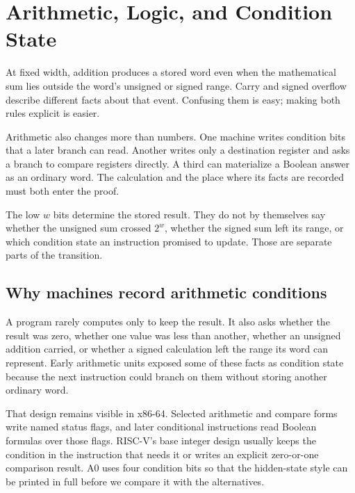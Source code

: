 \chapter{Arithmetic, Logic, and Condition State}
\label{ch:arithmetic-condition}

At fixed width, addition produces a stored word even when the mathematical
sum lies outside the word's unsigned or signed range. Carry and signed
overflow describe different facts about that event. Confusing them is easy;
making both rules explicit is easier.

Arithmetic also changes more than numbers. One machine writes condition bits
that a later branch can read. Another writes only a destination register and
asks a branch to compare registers directly. A third can materialize a Boolean
answer as an ordinary word. The calculation and the place where its facts are
recorded must both enter the proof.

\begin{keyidea}[title={A result word does not contain every arithmetic fact}]
The low \(w\) bits determine the stored result. They do not by themselves say
whether the unsigned sum crossed \(2^w\), whether the signed sum left its
range, or which condition state an instruction promised to update. Those are
separate parts of the transition.
\end{keyidea}

\section{Why machines record arithmetic conditions}

A program rarely computes only to keep the result. It also asks whether the
result was zero, whether one value was less than another, whether an unsigned
addition carried, or whether a signed calculation left the range its word can
represent. Early arithmetic units exposed some of these facts as condition state
because the next instruction could branch on them without storing another
ordinary word.

That design remains visible in x86-64. Selected arithmetic and compare forms
write named status flags, and later conditional instructions read Boolean
formulas over those flags. RISC-V's base integer design usually keeps the
condition in the instruction that needs it or writes an explicit zero-or-one
comparison result. A0 uses four condition bits so that the hidden-state style
can be printed in full before we compare it with the alternatives.

